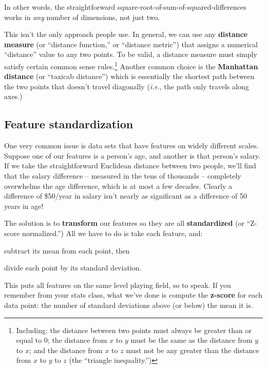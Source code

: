 In other words, the straightforward square-root-of-sum-of-squared-differences
works in \textit{any} number of dimensions, not just two.

This isn't the only approach people use. In general, we can use any
\textbf{distance measure} (or ``distance function,'' or ``distance metric'')
that assigns a numerical ``distance'' value to any two points. To be valid, a
distance measure must simply satisfy certain common sense
rules.\footnote{Including: the distance between two points must always be
greater than or equal to 0; the distance from $x$ to $y$ must be the same as
the distance from $y$ to $x$; and the distance from $x$ to $z$ must not be any
greater than the distance from $x$ to $y$ to $z$ (the ``triangle
inequality.'')} Another common choice is the \textbf{Manhattan distance} (or
``taxicab distance'') which is essentially the shortest path between the two
points that doesn't travel diagonally (\textit{i.e.}, the path only travels
along axes.)

\subsection{Feature standardization}

One very common issue is data sets that have features on widely different
scales. Suppose one of our features is a person's age, and another is that
person's salary. If we take the straightforward Euclidean distance between two
people, we'll find that the salary difference -- measured in the tens of
thousands -- completely overwhelms the age difference, which is at most a few
decades. Clearly a difference of \$50/year in salary isn't nearly as
significant as a difference of 50 years in age!

The solution is to \textbf{transform} our features so they are all
\textbf{standardized} (or ``Z-score normalized.'') All we have to do is take
each feature, and:

\begin{compactenum}
\item subtract its mean from each point, then
\item divide each point by its standard deviation.
\end{compactenum}

This puts all features on the same level playing field, so to speak. If you
remember from your stats class, what we've done is compute the
\textbf{z-score} for each data point: the number of standard deviations above
(or below) the mean it is.


